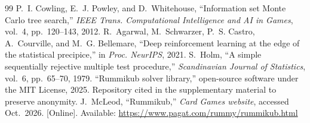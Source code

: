 \documentclass[10pt,journal,compsoc]{IEEEtran}
\begin{document}
\begin{thebibliography}{99}
 P.~I. Cowling, E.~J. Powley, and D.~Whitehouse, ``Information set Monte Carlo tree search,'' \emph{IEEE Trans. Computational Intelligence and AI in Games}, vol.~4, pp.~120--143, 2012.
 R.~Agarwal, M.~Schwarzer, P.~S. Castro, A.~Courville, and M.~G. Bellemare, ``Deep reinforcement learning at the edge of the statistical precipice,'' in \emph{Proc. NeurIPS}, 2021.
 S.~Holm, ``A simple sequentially rejective multiple test procedure,'' \emph{Scandinavian Journal of Statistics}, vol.~6, pp.~65--70, 1979.
 ``Rummikub solver library,'' open-source software under the MIT License, 2025. Repository cited in the supplementary material to preserve anonymity.
 J.~McLeod, ``Rummikub,'' \emph{Card Games website}, accessed Oct.~2026. [Online]. Available: \url{https://www.pagat.com/rummy/rummikub.html}
\end{thebibliography}
\end{document}
